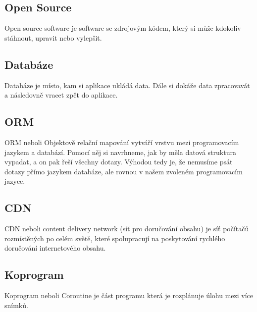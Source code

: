 \subsection{Open Source}
Open source software je software se zdrojovým kódem, který si může kdokoliv stáhnout, upravit nebo vylepšit. \cite{OpenSource}

\subsection{Databáze}
Databáze je místo, kam si aplikace ukládá data. Dále si dokáže data zpracovavát a následovně vracet zpět do aplikace.

\subsection{ORM}
ORM neboli Objektově relační mapování vytváří vrstvu mezi programovacím jazykem a databází. Pomocí něj si navrhneme, jak by měla datová struktura vypadat, a on pak řeší všechny dotazy. Výhodou tedy je, že nemusíme psát dotazy přímo jazykem databáze, ale rovnou v našem zvoleném programovacím jazyce.

\subsection{CDN}
CDN neboli content delivery network (síť pro doručování obsahu) je síť počítačů rozmístěných po celém světě, které spolupracují na poskytování rychlého doručování internetového obsahu.\cite{CDN}

\subsection{Koprogram}
Koprogram neboli Coroutine je část programu která je rozplánuje úlohu mezi více snímků.\cite{Coroutine} 
